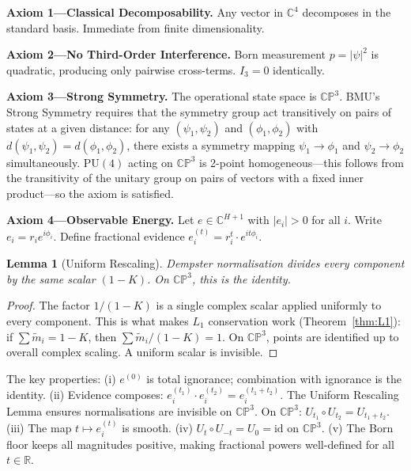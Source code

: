 \documentclass[11pt,a4paper]{article}
\newtheorem{lemma}[theorem]{Lemma}
\theoremstyle{definition}
\theoremstyle{remark}
\newcommand{\CP}{\mathbb{CP}}
\newcommand{\C}{\mathbb{C}}
\newcommand{\R}{\mathbb{R}}
\begin{document}
\textbf{Axiom 1---Classical Decomposability.} Any vector in $\C^4$ decomposes in the standard basis. Immediate from finite dimensionality.

\textbf{Axiom 2---No Third-Order Interference.} Born measurement $p=|\psi|^2$ is quadratic, producing only pairwise cross-terms. $I_3=0$ identically.

\textbf{Axiom 3---Strong Symmetry.} The operational state space is $\CP^3$. BMU's Strong Symmetry requires that the symmetry group act transitively on pairs of states at a given distance: for any $(\psi_1,\psi_2)$ and $(\phi_1,\phi_2)$ with $d(\psi_1,\psi_2)=d(\phi_1,\phi_2)$, there exists a symmetry mapping $\psi_1\to\phi_1$ and $\psi_2\to\phi_2$ simultaneously. $\mathrm{PU}(4)$ acting on $\CP^3$ is 2-point homogeneous---this follows from the transitivity of the unitary group on pairs of vectors with a fixed inner product---so the axiom is satisfied.

\textbf{Axiom 4---Observable Energy.} Let $e\in\C^{H+1}$ with $|e_i|>0$ for all $i$. Write $e_i=r_ie^{i\phi_i}$. Define fractional evidence $e^{(t)}_i=r^t_i\cdot e^{it\phi_i}$.

\begin{lemma}[Uniform Rescaling]\label{lem:uniform}
Dempster normalisation divides every component by the same scalar $(1-K)$. On $\CP^3$, this is the identity.
\end{lemma}

\begin{proof}
The factor $1/(1-K)$ is a single complex scalar applied uniformly to every component. This is what makes $L_1$ conservation work (Theorem~\ref{thm:L1}): if $\sum\tilde{m}_i=1-K$, then $\sum\tilde{m}_i/(1-K)=1$. On $\CP^3$, points are identified up to overall complex scaling. A uniform scalar is invisible.
\end{proof}

The key properties: (i) $e^{(0)}$ is total ignorance; combination with ignorance is the identity. (ii) Evidence composes: $e^{(t_1)}_i\cdot e^{(t_2)}_i=e^{(t_1+t_2)}_i$. The Uniform Rescaling Lemma ensures normalisations are invisible on $\CP^3$. On $\CP^3$: $U_{t_1}\circ U_{t_2}=U_{t_1+t_2}$. (iii) The map $t\mapsto e^{(t)}_i$ is smooth. (iv) $U_t\circ U_{-t}=U_0=\mathrm{id}$ on $\CP^3$. (v) The Born floor keeps all magnitudes positive, making fractional powers well-defined for all $t\in\R$.
\end{document}
